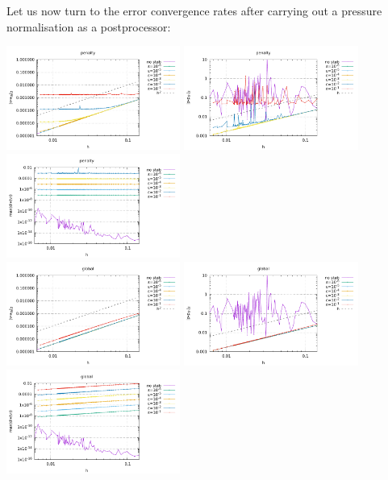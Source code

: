 Let us now turn to the error convergence rates after carrying out a pressure normalisation 
as a postprocessor:
\begin{center}
\includegraphics[width=5.7cm]{python_codes/fieldstone_115/results/dh/errorsV_penalty.pdf}
\includegraphics[width=5.7cm]{python_codes/fieldstone_115/results/dh/errorsP_penalty.pdf}
\includegraphics[width=5.7cm]{python_codes/fieldstone_115/results/dh/divv_penalty.pdf}\\
\includegraphics[width=5.7cm]{python_codes/fieldstone_115/results/dh/errorsV_global.pdf}
\includegraphics[width=5.7cm]{python_codes/fieldstone_115/results/dh/errorsP_global.pdf}
\includegraphics[width=5.7cm]{python_codes/fieldstone_115/results/dh/divv_global.pdf}\\

\end{center}
